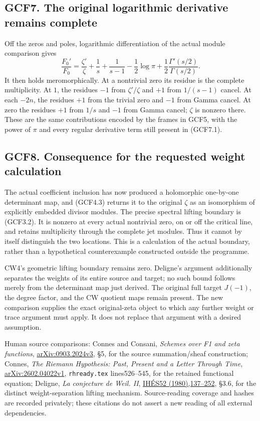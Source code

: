 \subsection{GCF7. The original logarithmic derivative remains
complete}\label{gcf7.-the-original-logarithmic-derivative-remains-complete}

Off the zeros and poles, logarithmic differentiation of the actual
module comparison gives \[
\frac{F_0'}{F_0}
=\frac{\zeta'}{\zeta}
+\frac1s+\frac1{s-1}-\frac12\log\pi
+\frac12\frac{\Gamma'(s/2)}{\Gamma(s/2)}.
\tag{GCF7.1}
\] It then holds meromorphically. At a nontrivial zero its residue is
the complete multiplicity. At \(1\), the residues \(-1\) from
\(\zeta'/\zeta\) and \(+1\) from \(1/(s-1)\) cancel. At each \(-2n\),
the residues \(+1\) from the trivial zero and \(-1\) from Gamma cancel.
At zero the residues \(+1\) from \(1/s\) and \(-1\) from Gamma cancel;
\(\zeta\) is nonzero there. These are the same contributions encoded by
the frames in GCF5, with the power of \(\pi\) and every regular
derivative term still present in (GCF7.1).

\subsection{GCF8. Consequence for the requested weight
calculation}\label{gcf8.-consequence-for-the-requested-weight-calculation}

The actual coefficient inclusion has now produced a holomorphic
one-by-one determinant map, and (GCF4.3) returns it to the original
\(\zeta\) as an isomorphism of explicitly embedded divisor modules. The
precise spectral lifting boundary is (GCF3.2). It is nonzero at every
actual nontrivial zero, on or off the critical line, and retains
multiplicity through the complete jet modules. Thus it cannot by itself
distinguish the two locations. This is a calculation of the actual
boundary, rather than a hypothetical counterexample constructed outside
the programme.

CW4's geometric lifting boundary remains zero. Deligne's argument
additionally separates the weights of its entire source and target; no
such bound follows merely from the determinant map just derived. The
original full target \(J(-1)\), the degree factor, and the CW quotient
maps remain present. The new comparison supplies the exact original-zeta
object to which any further weight or trace argument must apply. It does
not replace that argument with a desired assumption.

Human source comparisons: Connes and Consani, \emph{Schemes over F1 and
zeta functions},
\href{https://arxiv.org/abs/0903.2024}{arXiv:0903.2024v3}, §5, for the
source summation/sheaf construction; Connes, \emph{The Riemann
Hypothesis: Past, Present and a Letter Through Time},
\href{https://arxiv.org/abs/2602.04022}{arXiv:2602.04022v1},
\texttt{rhready.tex} lines526--545, for the retained functional
equation; Deligne, \emph{La conjecture de Weil. II},
\href{https://www.numdam.org/item/PMIHES_1980__52__137_0/}{IHÉS52
(1980),137--252}, §3.6, for the distinct weight-separation lifting
mechanism. Source-reading coverage and hashes are recorded privately;
these citations do not assert a new reading of all external
dependencies.
